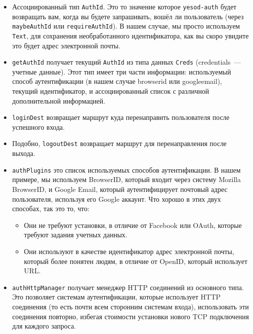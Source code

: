 \begin{itemize}
    \item Ассоциированный тип \lstinline'AuthId'. Это то значение которое \lstinline'yesod-auth' будет возвращать вам, когда вы будете запрашивать, вошёл ли пользователь (через \lstinline'maybeAuthId' или \lstinline'requireAuthId'). В нашем случае, мы просто используем \lstinline'Text', для сохранения необработанного идентификатора, как вы скоро увидите это будет адрес электронной почты. 

    \item \lstinline'getAuthId' получает текущий \lstinline'AuthId' из типа данных \lstinline'Creds' (credentials~--- учетные данные). Этот тип имеет три части информации: используемый способ аутентификации (в нашем случае browserid или googleemail), текущий идентификатор, и ассоциированный список с различной дополнительной информацией.

    \item \lstinline'loginDest' возвращает маршрут куда перенаправить пользователя после успешного входа.

    \item Подобно, \lstinline'logoutDest' возвращает маршрут для перенаправления после выхода. 

    \item \lstinline'authPlugins' это список используемых способов аутентификации. В нашем примере, мы используем BrowserID, который входит через систему Mozilla BrowserID, и Google Email, который аутентифицирует почтовый адрес пользователя, используя его Google аккаунт. Что хорошо в этих двух способах, так это то, что:
    
    \begin{itemize}
        \item Они не требуют установки, в отличие от Facebook или OAuth, которые требуют задания учетных данных.
        
        \item Они используют в качестве идентификатор адрес электронной почты, который более понятен людям, в отличие от OpenID, который использует URL. 
    \end{itemize}
    
    \item \lstinline'authHttpManager' получает менеджер HTTP соединений из основного типа. Это позволяет системам аутентификации, которые использует HTTP соединения (то есть почти всем сторонним системам входа), использовать эти соединения повторно, избегая стоимости установки нового TCP подключения для каждого запроса.
\end{itemize}

